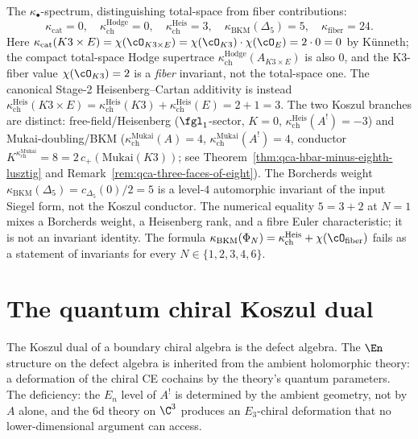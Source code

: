 \begin{conjecture}
The $\kappa_\bullet$-spectrum, distinguishing total-space from fiber contributions:
\[
 \kappa_{\mathrm{cat}} = 0, \quad \kappa_{\mathrm{ch}}^{\mathrm{Hodge}} = 0, \quad \kappa_{\mathrm{ch}}^{\mathrm{Heis}} = 3, \quad \kappa_{\mathrm{BKM}}(\Delta_5) = 5, \quad \kappa_{\mathrm{fiber}} = 24.
\]
Here $\kappa_{\mathrm{cat}}(K3 \times E) = \chi(\cO_{K3 \times E}) = \chi(\cO_{K3}) \cdot \chi(\cO_E) = 2 \cdot 0 = 0$ by K\"unneth; the compact total-space Hodge supertrace $\kappa_{\mathrm{ch}}^{\mathrm{Hodge}}(A_{K3\times E})$ is also $0$, and the K3-fiber value $\chi(\cO_{K3}) = 2$ is a \emph{fiber} invariant, not the total-space one.
The canonical Stage-2 Heisenberg--Cartan additivity is instead $\kappa_{\mathrm{ch}}^{\mathrm{Heis}}(K3 \times E) = \kappa_{\mathrm{ch}}^{\mathrm{Heis}}(K3) + \kappa_{\mathrm{ch}}^{\mathrm{Heis}}(E) = 2 + 1 = 3$. The two Koszul branches are distinct: free-field/Heisenberg ($\fgl_1$-sector, $K = 0$, $\kappa_{\mathrm{ch}}^{\mathrm{Heis}}(A^!) = -3$) and Mukai-doubling/BKM ($\kappa_{\mathrm{ch}}^{\mathrm{Mukai}}(A) = 4$, $\kappa_{\mathrm{ch}}^{\mathrm{Mukai}}(A^!) = 4$, conductor $K^{\kappa_{\mathrm{ch}}^{\mathrm{Mukai}}} = 8 = 2\,c_+(\mathrm{Mukai}(K3))$; see Theorem~\ref{thm:qca-hbar-minus-eighth-lusztig} and Remark~\ref{rem:qca-three-faces-of-eight}). The Borcherds weight $\kappa_{\mathrm{BKM}}(\Delta_5) = c_{\Delta_5}(0)/2 = 5$ is a level-$4$ automorphic invariant of the input Siegel form, not the Koszul conductor. The numerical equality \(5=3+2\) at \(N=1\) mixes a Borcherds weight, a Heisenberg rank, and a fibre Euler characteristic; it is not an invariant identity. The formula $\kappa_{\mathrm{BKM}}(\Phi_N)=\kappa_{\mathrm{ch}}^{\mathrm{Heis}}+\chi(\cO_{\mathrm{fiber}})$ fails as a statement of invariants for every \(N\in\{1,2,3,4,6\}\).
\end{conjecture}



\section{The quantum chiral Koszul dual}
\label{sec:qca-koszul-dual}

The Koszul dual of a boundary chiral algebra is the defect algebra. The $\En$ structure on the defect algebra is inherited from the ambient holomorphic theory: a deformation of the chiral CE cochains by the theory's quantum parameters. The deficiency: the $E_n$ level of $A^!$ is determined by the ambient geometry, not by $A$ alone, and the 6d theory on $\C^3$ produces an $E_3$-chiral deformation that no lower-dimensional argument can access.

